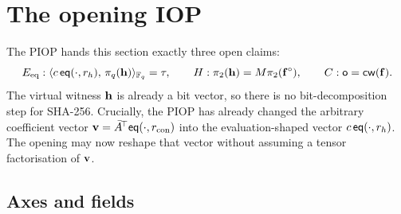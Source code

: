 \section{The opening IOP}\label{sec:iopp}

The PIOP hands this section exactly three open claims:
\[
  E_{\rm eq}:\langle c\,\mathsf{eq}(\cdot,r_h),\, \pi_q(\mathbf{h})\rangle_{\mathbb{F}_q}=\tau,
  \qquad
  H:\pi_2(\mathbf{h})=M\pi_2(\mathbf{f}^{\circ}),
  \qquad
  C:\mathsf{o}=\mathsf{cw}(\mathbf{f}).
\]
The virtual witness $\mathbf{h}$ is already a bit vector, so there is no
bit-decomposition step for SHA-256.  Crucially, the PIOP has already changed the
arbitrary coefficient vector $\mathbf{v}=\bar A^{\!\top}\mathsf{eq}(\cdot,r_{\rm con})$ into
the evaluation-shaped vector $c\,\mathsf{eq}(\cdot,r_h)$.  The opening may now reshape
that vector without assuming a tensor factorisation of $\mathbf{v}$.

\subsection{Axes and fields}

